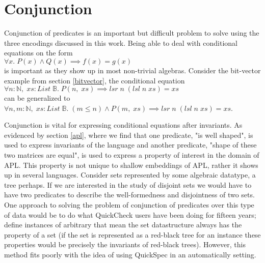 \section{Conjunction}\label{conjunction}
Conjunction of predicates is an important
but difficult problem to solve using the three
encodings discussed in this work.
Being able to deal with conditional equations on the form
\\$\forall x.\;P(x)\wedge Q(x)\implies f(x)=g(x)$\\
is important as they show up in most non-trivial
algebras. Consider the bit-vector example from section
\ref{bitvector}, the conditional equation
\\$\forall n:\mathbb{N},\;xs:List\;\mathbb{B}.\;P(n,\;xs)\implies lsr\;n\;(lsl\;n\;xs)=xs$\\
can be generalized to
\\$\forall n,m:\mathbb{N},\;xs:List\;\mathbb{B}.\;(m\leq n)\wedge P(m,\;xs)\implies lsr\;n\;(lsl\;n\;xs)=xs$.

Conjunction is vital for expressing conditional equations after invariants.
As evidenced by section \ref{apl}, where we find that one predicate, "is well shaped",
is used to express invariants of the language and another predicate, "shape of these two matrices
are equal", is used to express a property of interest in the domain of APL.
This property is not unique to shallow embeddings of APL, rather it shows up in several languages.
Consider sets represented by some algebraic datatype, a tree perhaps. If we are interested
in the study of disjoint sets we would have to have two predicates to describe the well-formedness
and disjointness of two sets. One approach to solving the problem of conjunction of predicates over this
type of data would be to do what QuickCheck users have been doing for fifteen years; define instances
of arbitrary that mean the set datastructure always has the property of a set (if the set is represented
as a red-black tree for an instance these properties would be precisely the invariants of red-black trees). 
However, this method fits poorly with the idea of using QuickSpec in an automatically setting.

